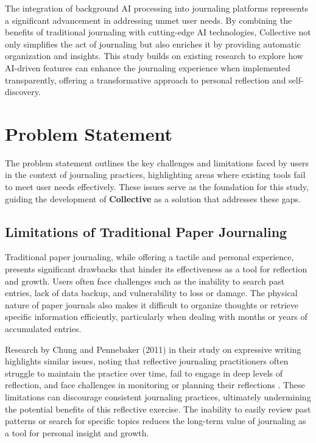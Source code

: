 The integration of background AI processing into journaling platforms represents a significant advancement in addressing unmet user needs. By combining the benefits of traditional journaling with cutting-edge AI technologies, Collective not only simplifies the act of journaling but also enriches it by providing automatic organization and insights. This study builds on existing research to explore how AI-driven features can enhance the journaling experience when implemented transparently, offering a transformative approach to personal reflection and self-discovery.

\section{Problem Statement}\label{sec:problem}

The problem statement outlines the key challenges and limitations faced by users in the context of journaling practices, highlighting areas where existing tools fail to meet user needs effectively. These issues serve as the foundation for this study, guiding the development of \textbf{Collective} as a solution that addresses these gaps.

\subsection{Limitations of Traditional Paper Journaling}\label{subsec:traditional-limits}

Traditional paper journaling, while offering a tactile and personal experience, presents significant drawbacks that hinder its effectiveness as a tool for reflection and growth. Users often face challenges such as the inability to search past entries, lack of data backup, and vulnerability to loss or damage. The physical nature of paper journals also makes it difficult to organize thoughts or retrieve specific information efficiently, particularly when dealing with months or years of accumulated entries.

Research by Chung and Pennebaker (2011) in their study on expressive writing highlights similar issues, noting that reflective journaling practitioners often struggle to maintain the practice over time, fail to engage in deep levels of reflection, and face challenges in monitoring or planning their reflections \cite{chung2011expressive}. These limitations can discourage consistent journaling practices, ultimately undermining the potential benefits of this reflective exercise. The inability to easily review past patterns or search for specific topics reduces the long-term value of journaling as a tool for personal insight and growth.

